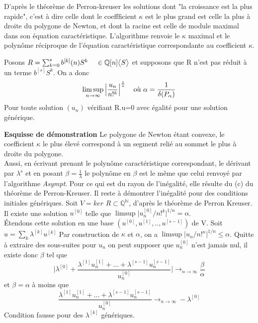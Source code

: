 \documentclass[a4paper,10.5pt]{article}
\begin{document}
	\noindent D'après le théorème de Perron-kreuser les solutions dont "la croissance est la plus rapide", c'est à dire celle dont le coeffficient $\kappa$ est le plus grand est celle la plus à droite du polygone de Newton, et dont la racine est celle de module maximal dans son équation caractéristique.
	L'algorithme renvoie le $\kappa$ maximal et le polynôme réciproque de l'équation caractéristique correspondante au coefficient $\kappa$.
	
	\begin{proposition} Posons $R=\sum_{k=0}^{s} b^{[k]}(n)S^{k} \hspace{4mm} \in \mathbb{Q}[n]\big<S\big>$ et supposons que R n'est pas réduit à un terme $b^{[s]}S^{k}$. On a donc
		\[\limsup_{n \rightarrow \infty }\Big|\frac{u_{n}}{n!^{k}}\Big|^{\frac{1}{n}} \hspace{4mm} \text{où } \alpha=\frac{1}{\delta(P_{\alpha})}\]
		Pour toute solution $(u_{n})$ vérifiant R.u=0 avec égalité pour une solution générique. 
	\end{proposition}
	\textbf{Esquisse de démonstration}
	Le polygone de Newton étant convexe, le coefficient $\kappa$ le plus élevé correspond à un segment relié au sommet le plus à droite du polygone.\\
	Aussi, en écrivant prenant le polynôme caractéristique correspondant, le dérivant par $\lambda^{s}$ et en posant $\beta=\frac{1}{\lambda}$ le polynôme en $\beta$ est le même que celui renvoyé par l'algorithme \textit{Asympt}. Pour ce qui est du rayon de l'inégalité, elle résulte du (c) du théorème de Perron-Kreuser.
	Il reste à démontrer l'inégalité pour des conditions initiales génériques. Soit $V=ker$ $R \subset \mathbb{Q}^{\mathbb{N}}$, d'après le théorème de Perron Kreuser.\\
	Il existe une solution $u^{[0]}$ telle que $\limsup \big|u^{[0]}_{n}/n!^{k}\big|^{1/n}=\alpha$.\\
	Étendons cette solution en une base $(u^{[0]},u^{[1]},..,u^{[s-1]})$ de V. Soit $u=\sum_{k}\lambda^{[k]}u^{[k]}$
	Par construction de $\kappa$ et $\alpha$, on a $\limsup \big|u_{n}/n!^{\kappa}\big|^{1/n} \leq \alpha$. Quitte à extraire des sous-suites pour $u_{n}$ on peut supposer que $u^{[0]}_{n}$ n'est jamais nul, il existe donc $\beta$ tel que
	\[\Big|\lambda^{[0]}+\frac{\lambda^{[1]}u^{[1]}_{n}+...+\lambda^{[s-1]}u^{[s-1]}_{n}}{u^{[0]}_{n}}\Big| \rightarrow_{n \rightarrow \infty} \frac{\beta}{\alpha}\] 
	et $\beta=\alpha$ à moins que 
	\[\frac{\lambda^{[1]}u^{[1]}_{n}+...+\lambda^{[s-1]}u^{[s-1]}_{n}}{u^{[0]}_{n}}\rightarrow_{n \rightarrow \infty}-\lambda^{[0]}\]
	Condition fausse pour des $\lambda^{[k]}$ génériques.
	
\end{document}
